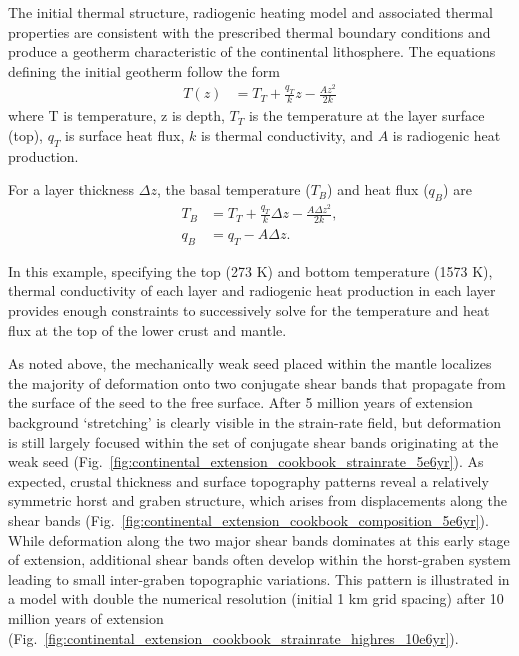 \documentclass{article}
\begin{document}
The initial thermal structure, radiogenic heating model and associated thermal properties are consistent with the prescribed thermal boundary conditions and produce a geotherm characteristic of the continental lithosphere. The equations defining the initial geotherm \cite{Cha86} follow the form
\begin{align}
  \label{eq:continental-geotherm-1}
  T(z) &= T_T + \frac{q_T}{k}z - \frac{Az^2}{2k}
\end{align}
where T is temperature, z is depth, $T_T$ is the temperature at the layer surface (top), $q_T$ is surface heat flux, $k$ is thermal conductivity, and $A$ is radiogenic heat production.

For a layer thickness $\Delta z$, the basal temperature ($T_B$) and heat flux ($q_B$) are
\begin{align}
  \label{eq:continental-geotherm-2}
  T_B &= T_T + \frac{q_T}{k} \Delta z - \frac{A \Delta z^2}{2k},
  \\
  \label{eq:continental-geotherm-3}
  q_B &= q_T - A \Delta z.
\end{align}

In this example, specifying the top (273 K) and bottom temperature (1573 K), thermal conductivity of each layer and radiogenic heat production in each layer provides enough constraints to successively solve for the temperature and heat flux at the top of the lower crust and mantle.

As noted above, the mechanically weak seed placed within the mantle localizes the majority of deformation onto two conjugate shear bands that propagate from the surface of the seed to the free surface. After 5 million years of extension background `stretching' is clearly visible in the strain-rate field, but deformation is still largely focused within the set of conjugate shear bands originating at the weak seed  (Fig.~\ref{fig:continental_extension_cookbook_strainrate_5e6yr}). As expected, crustal thickness and surface topography patterns reveal a relatively symmetric horst and graben structure, which arises from displacements along the shear bands (Fig.~\ref{fig:continental_extension_cookbook_composition_5e6yr}). While deformation along the two major shear bands dominates at this early stage of extension, additional shear bands often develop within the horst-graben system leading to small inter-graben topographic variations. This pattern is illustrated in a model with double the numerical resolution (initial 1 km grid spacing) after 10 million years of extension  (Fig.~\ref{fig:continental_extension_cookbook_strainrate_highres_10e6yr}).
\end{document}
